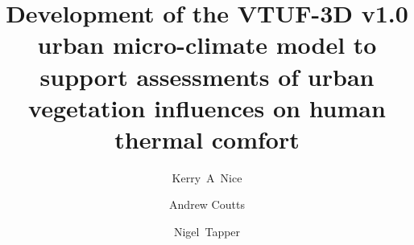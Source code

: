 \documentclass[final,3p,times,authoryear]{elsarticle}
\begin{document}
\begin{frontmatter}



\title{Development of the VTUF-3D v1.0 urban micro-climate model to support assessments of urban vegetation influences on human thermal comfort}


\author[monash,crc]{Kerry~A~Nice}
\author[monash,crc]{Andrew Coutts}
\author[monash,crc]{Nigel~Tapper}
\address[monash]{School of Earth, Atmosphere and Environment, Monash University, Clayton, VIC 3800, Australia}
\address[crc]{Cooperative Research Centre for Water Sensitive Cities, Melbourne, Australia}


\begin{abstract}


\end{abstract}
\end{frontmatter}
\end{document}
